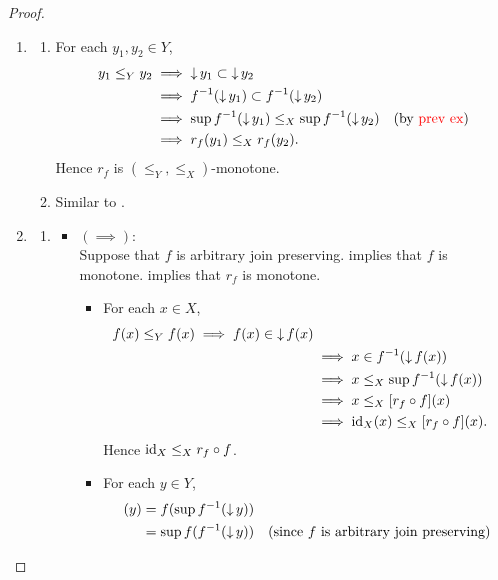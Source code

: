 \documentclass{book}
\begin{document}
	\begin{proof}\
		\begin{enumerate}
			\item 
			\begin{enumerate}
				\item For each $y_1, y_2 \in Y$, 
				\begin{align*}
					y_1 \leq_Y y_2
					& \implies \operatorname{\downarrow} y_1 \subset \operatorname{\downarrow} y_2 \\
					& \implies f^{-1}(\operatorname{\downarrow} y_1) \subset f^{-1}(\operatorname{\downarrow} y_2) \\
					& \implies \sup f^{-1}(\operatorname{\downarrow} y_1) \leq_X \sup f^{-1}(\operatorname{\downarrow} y_2) \quad \text{(by \textcolor{red}{prev ex})} \\
					& \implies r_f(y_1) \leq_X r_f(y_2).
				\end{align*}
				Hence $r_f$ is $(\leq_Y, \leq_X)$-monotone.
				\item Similar to .
			\end{enumerate}
			\item 
			\begin{enumerate}
				\item 
				\begin{itemize}
					\item $(\implies)$: \\
					Suppose that $f$ is arbitrary join preserving.  \rex{} implies that $f$ is monotone.  implies that $r_f$ is monotone. 
					\begin{itemize}
						\item For each $x \in X$,
						\begin{align*}
							f(x) \leq_Y f(x)
							\implies f(x) \in \operatorname{\downarrow} f(x) \\
							& \implies x \in f^{-1}(\operatorname{\downarrow} f(x)) \\
							& \implies x \leq_X \sup f^{-1}(\operatorname{\downarrow} f(x)) \\
							& \implies x \leq_X [r_f \circ f](x) \\
							& \implies \operatorname{id}_X(x) \leq_X [r_f \circ f](x).
						\end{align*}
						Hence $\operatorname{id}_X \leq_X r_f \circ f$.
						\item For each $y \in Y$,
						\begin{align*}
							[f \circ r_f](y) 
							& = f( \sup f^{-1}(\doar y)) \\
							& = \sup f( f^{-1}(\doar y)) \quad \text{(since $f$ is arbitrary join preserving)} \\

\end{align*}
\end{itemize}
\end{itemize}
\end{enumerate}
\end{enumerate}
\end{proof}
\end{document}
